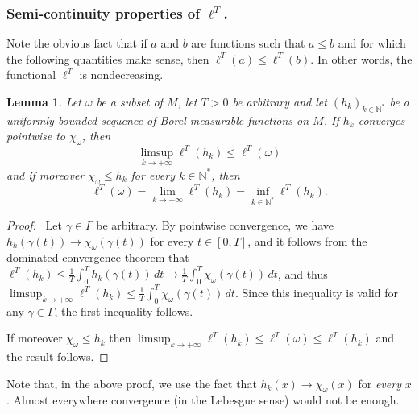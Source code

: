 \documentclass[JEP,XML,SOM,Unicode, NoEqCountersInSection,NoFloatCountersInSection,published]{cedram}
\def\N{\mathbb{N}}
\newtheorem{lemma}{Lemma}
\theoremstyle{definition}
\begin{document}
\subsubsection*{Semi-continuity properties of $\ell^T$.}
Note the obvious fact that if $a$ and $b$ are functions such that $a\leq b$ and for which the following quantities make sense, then $\ell^T(a)\leq \ell^T(b)$. In other words, the functional $\ell^T$ is nondecreasing.

\begin{lemma}\label{lemBorel}
Let $\omega$ be a subset of $M$, let $T>0$ be arbitrary and let $(h_k)_{k\in\N^*}$ be a uniformly bounded sequence of Borel measurable functions on $M$.
If $h_k$ converges pointwise to $\chi_\omega$, then
\[
\limsup_{k\rightarrow +\infty} \ell^T(h_k)\leq \ell^T(\omega)
\]
and if moreover $\chi_{\omega}\leq h_k$ for every $k\in\N^*$, then
\[
\ell^T(\omega) = \lim_{k\rightarrow +\infty} \ell^T(h_k) = \inf_{k\in\N^*} \ell^T(h_k).
\]
\end{lemma}

\begin{proof}\
Let $\gamma\in\Gamma$ be arbitrary. By pointwise convergence, we have $h_k(\gamma(t))\rightarrow\chi_\omega(\gamma(t))$ for every $t\in[0,T]$, and it follows from the dominated convergence theorem that $\ell^T(h_k)\leq \frac{1}{T} \int_0^T h_k(\gamma(t))\, dt \rightarrow \frac{1}{T} \int_0^T \chi_\omega(\gamma(t))\, dt$, and thus $\limsup_{k\rightarrow +\infty} \ell^T(h_k)\leq \frac{1}{T} \int_0^T \chi_\omega(\gamma(t))\, dt$. Since this inequality is valid for any $\gamma\in\Gamma$, the first inequality follows.

If moreover $\chi_{\omega}\leq h_k$ then $\limsup_{k\rightarrow+\infty} \ell^T(h_k)\leq \ell^T(\omega)\leq \ell^T(h_k)$ and the result follows.
\end{proof}

Note that, in the above proof, we use the fact that $h_k(x)\rightarrow\chi_\omega(x)$ for \textit{every} $x$. Almost everywhere convergence (in the Lebesgue sense) would not be enough.
\end{document}
